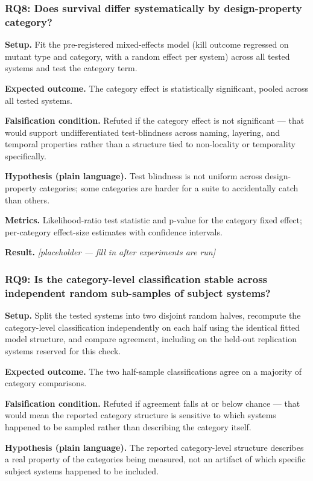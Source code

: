 \documentclass[11pt]{article}
\newcommand{\ph}{\textit{[placeholder --- fill in after experiments are run]}}
\begin{document}
\subsubsection{RQ8: Does survival differ systematically by design-property category?}
\textbf{Setup.} Fit the pre-registered mixed-effects model (kill outcome regressed on mutant type and category, with a random effect per system) across all tested systems and test the category term.

\textbf{Expected outcome.} The category effect is statistically significant, pooled across all tested systems.

\textbf{Falsification condition.} Refuted if the category effect is not significant --- that would support undifferentiated test-blindness across naming, layering, and temporal properties rather than a structure tied to non-locality or temporality specifically.

\textbf{Hypothesis (plain language).} Test blindness is not uniform across design-property categories; some categories are harder for a suite to accidentally catch than others.

\textbf{Metrics.} Likelihood-ratio test statistic and p-value for the category fixed effect; per-category effect-size estimates with confidence intervals.

\textbf{Result.} \ph

\subsubsection{RQ9: Is the category-level classification stable across independent random sub-samples of subject systems?}
\textbf{Setup.} Split the tested systems into two disjoint random halves, recompute the category-level classification independently on each half using the identical fitted model structure, and compare agreement, including on the held-out replication systems reserved for this check.

\textbf{Expected outcome.} The two half-sample classifications agree on a majority of category comparisons.

\textbf{Falsification condition.} Refuted if agreement falls at or below chance --- that would mean the reported category structure is sensitive to which systems happened to be sampled rather than describing the category itself.

\textbf{Hypothesis (plain language).} The reported category-level structure describes a real property of the categories being measured, not an artifact of which specific subject systems happened to be included.
\end{document}
